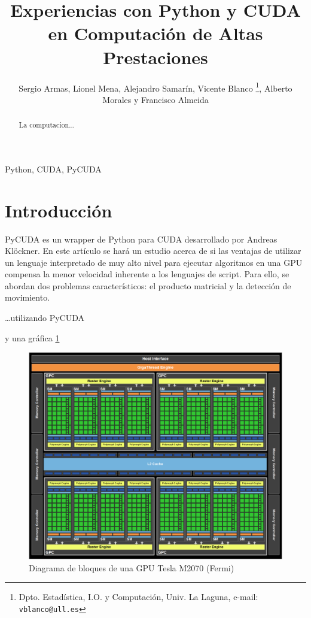 \documentclass[twocolumn,twoside]{Jornadas}
\begin{document}
\title{Experiencias con Python y CUDA en Computación de Altas Prestaciones}

\author{Sergio Armas,%
     Lionel Mena,%
     Alejandro Samarín,%
     Vicente Blanco%
     \thanks{Dpto. Estadística, I.O. y Computación, Univ. La Laguna, e-mail: {\tt vblanco@ull.es}},%
     Alberto Morales y %
     Francisco Almeida
}

\maketitle
\markboth{}{}
\pagestyle{empty} 
\thispagestyle{empty} %

\begin{abstract}
La computacion...
\end{abstract}

\begin{keywords}
Python, CUDA, PyCUDA
\end{keywords}

\section{Introducción}

PyCUDA es un wrapper de Python para CUDA desarrollado por Andreas Kl\"{o}ckner. En este art\'{i}culo se har\'{a} un estudio acerca de si las ventajas de utilizar un lenguaje interpretado de muy alto nivel para ejecutar algoritmos en una GPU compensa la menor velocidad inherente a los lenguajes de script.
Para ello, se abordan dos problemas caracter\'{i}sticos: el producto matricial y la detecci\'{o}n de movimiento.

\ldots utilizando PyCUDA~\cite{DBLP:journals/corr/abs-0911-3456}

y una gráfica \ref{fig:Fermi}

\begin{figure}
	\includegraphics[width=.45\textwidth]{block_diagram_Fermi}
	\caption{\label{fig:Fermi} Diagrama de bloques de una GPU Tesla M2070 (Fermi)}
\end{figure}
\end{document}
